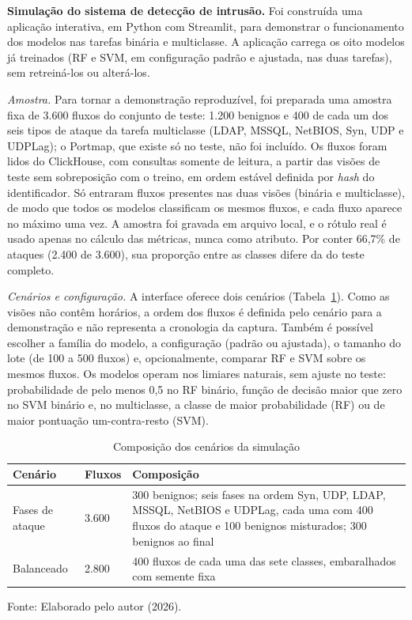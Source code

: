 \documentclass[
    12pt,                %
    openright,           %
    oneside,             %
    a4paper,             %
    english,             %
    brazil               %
]{abntex2}
\begin{document}
\textbf{Simulação do sistema de detecção de intrusão.} Foi construída uma aplicação interativa, em Python com Streamlit, para demonstrar o funcionamento dos modelos nas tarefas binária e multiclasse. A aplicação carrega os oito modelos já treinados (RF e SVM, em configuração padrão e ajustada, nas duas tarefas), sem retreiná-los ou alterá-los.

\textit{Amostra.} Para tornar a demonstração reproduzível, foi preparada uma amostra fixa de 3.600 fluxos do conjunto de teste: 1.200 benignos e 400 de cada um dos seis tipos de ataque da tarefa multiclasse (LDAP, MSSQL, NetBIOS, Syn, UDP e UDPLag); o Portmap, que existe só no teste, não foi incluído. Os fluxos foram lidos do ClickHouse, com consultas somente de leitura, a partir das visões de teste sem sobreposição com o treino, em ordem estável definida por \textit{hash} do identificador. Só entraram fluxos presentes nas duas visões (binária e multiclasse), de modo que todos os modelos classificam os mesmos fluxos, e cada fluxo aparece no máximo uma vez. A amostra foi gravada em arquivo local, e o rótulo real é usado apenas no cálculo das métricas, nunca como atributo. Por conter 66,7\% de ataques (2.400 de 3.600), sua proporção entre as classes difere da do teste completo.

\textit{Cenários e configuração.} A interface oferece dois cenários (Tabela~\ref{tab:cenarios-simulacao}). Como as visões não contêm horários, a ordem dos fluxos é definida pelo cenário para a demonstração e não representa a cronologia da captura. Também é possível escolher a família do modelo, a configuração (padrão ou ajustada), o tamanho do lote (de 100 a 500 fluxos) e, opcionalmente, comparar RF e SVM sobre os mesmos fluxos. Os modelos operam nos limiares naturais, sem ajuste no teste: probabilidade de pelo menos 0,5 no RF binário, função de decisão maior que zero no SVM binário e, no multiclasse, a classe de maior probabilidade (RF) ou de maior pontuação um-contra-resto (SVM).

\begin{table}
\centering
\caption{Composição dos cenários da simulação}
\label{tab:cenarios-simulacao}
\footnotesize
\begin{tabular}{p{3.0cm}p{2.0cm}p{8.8cm}}
\hline
Cenário & Fluxos & Composição \\
\hline
Fases de ataque & 3.600 & 300 benignos; seis fases na ordem Syn, UDP, LDAP, MSSQL, NetBIOS e UDPLag, cada uma com 400 fluxos do ataque e 100 benignos misturados; 300 benignos ao final \\
Balanceado & 2.800 & 400 fluxos de cada uma das sete classes, embaralhados com semente fixa \\
\hline
\end{tabular}
\par\smallskip
Fonte: Elaborado pelo autor (2026).
\end{table}
\end{document}

